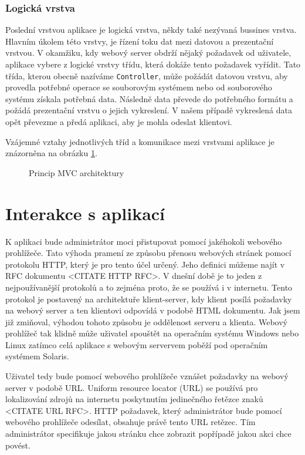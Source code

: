         \subsubsection{Logická vrstva}
        Poslední vrstvou aplikace je logická vrstva, někdy také nezývaná bussines vrstva. Hlavním úkolem této vrstvy, je řízení toku dat mezi datovou a prezentační vrstvou. V okamžiku, kdy webový server obdrží nějaký požadavek od uživatele, aplikace vybere z logické vrstvy třídu, která dokáže tento požadavek vyřídit. Tato třída, kterou obecně nazíváme \verb|Controller|, může požádát datovou vrstvu, aby provedla potřebné operace se souborovým systémem nebo od souborového systému získala potřebná data. Následně data převede do potřebného formátu a požádá prezentační vrstvu o jejich vykreslení. V našem případě vykreslená data opět převezme a předá aplikaci, aby je mohla odeslat klientovi.

        Vzájemné vztahy jednotlivých tříd a komunikace mezi vrstvami aplikace je znázorněna na obrázku \ref{mvc}.

    \begin{figure}[h]
        \caption{Princip MVC architektury}
        \label{mvc}
    \end{figure}
\section{Interakce s aplikací}
K aplikaci bude administrátor moci přistupovat pomocí jakéhokoli webového prohlížeče. Tato výhoda pramení ze způsobu přenosu webových stránek pomocí protokolu HTTP, který je pro tento účel určený. Jeho definici můžeme najít v RFC dokumentu <CITATE HTTP RFC>. V dnešní době je to jeden z nejpoužívanější protokolů a to zejména proto, že se používá i v internetu. Tento protokol je postavený na architektuře klient-server, kdy klient posílá požadavky na webový server a ten klientovi odpovídá v podobě HTML dokumentu. Jak jsem již zmiňoval, výhodou tohoto způsobu je oddělenost serveru a klienta. Webový prohlížeč tak klidně může uživatel spouštět na operačním systému Windows nebo Linux zatímco celá aplikace s webovým servervem poběží pod operačním systémem Solaris.

Uživatel tedy bude pomocí webového prohlížeče vznášet požadavky na webový server v podobě URL. Uniform resource locator (URL) se používá pro lokalizování zdrojů na internetu poskytnutím jedinečného řetězce znaků <CITATE URL RFC>. HTTP požadavek, který administrátor bude pomocí webového prohlížeče odesílat, obsahuje právě tento URL retězec. Tím administrátor specifikuje jakou stránku chce zobrazit popřípadě jakou akci chce povést.

